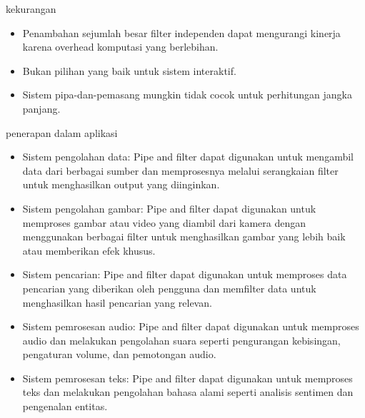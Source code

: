 \documentclass{beamer}
\begin{document}
\begin{frame}{kekurangan}
	\begin{itemize}
	\item 	Penambahan sejumlah besar filter independen dapat mengurangi kinerja karena overhead komputasi yang berlebihan.
	\item Bukan pilihan yang baik untuk sistem interaktif.
	\item Sistem pipa-dan-pemasang mungkin tidak cocok untuk perhitungan jangka panjang.
\end{itemize}

\end{frame}
		\begin{frame}{penerapan dalam aplikasi}
			\begin{itemize}
			\item Sistem pengolahan data: Pipe and filter dapat digunakan untuk mengambil data dari berbagai sumber dan memprosesnya melalui serangkaian filter untuk menghasilkan output yang diinginkan.
			
			\item Sistem pengolahan gambar: Pipe and filter dapat digunakan untuk memproses gambar atau video yang diambil dari kamera dengan menggunakan berbagai filter untuk menghasilkan gambar yang lebih baik atau memberikan efek khusus.
			
			\item Sistem pencarian: Pipe and filter dapat digunakan untuk memproses data pencarian yang diberikan oleh pengguna dan memfilter data untuk menghasilkan hasil pencarian yang relevan.
			
			\item Sistem pemrosesan audio: Pipe and filter dapat digunakan untuk memproses audio dan melakukan pengolahan suara seperti pengurangan kebisingan, pengaturan volume, dan pemotongan audio.
			
			\item Sistem pemrosesan teks: Pipe and filter dapat digunakan untuk memproses teks dan melakukan pengolahan bahasa alami seperti analisis sentimen dan pengenalan entitas.
		\end{itemize}
		\end{frame}
	
\end{document}
